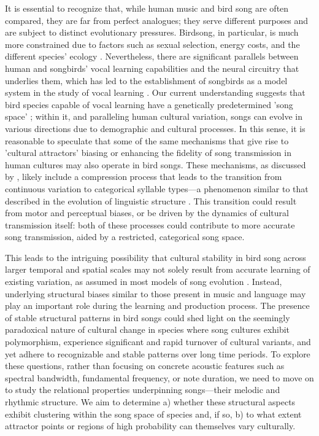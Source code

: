 It is essential to recognize that, while human music and bird song are often compared, they are far from perfect analogues; they serve different purposes and are subject to distinct evolutionary pressures. Birdsong, in particular, is much more constrained due to factors such as sexual selection, energy costs, and the different species' ecology \autocite{verzijden2012, demery2021, nowicki1998, spencer2003, sierro2023}. Nevertheless, there are significant parallels between human and songbirds' vocal learning capabilities and the neural circuitry that underlies them, which has led to the establishment of songbirds as a model system in the study of vocal learning \autocite{jarvis2019, rouse2021}. Our current understanding suggests that bird species capable of vocal learning have a genetically predetermined 'song space' \autocite{james2017, lachlan2010}; within it, and paralleling human cultural variation, songs can evolve in various directions due to demographic and cultural processes. In this sense, it is reasonable to speculate that some of the same mechanisms that give rise to 'cultural attractors' biasing or enhancing the fidelity of song transmission in human cultures may also operate in bird songs. These mechanisms, as discussed by \autocite{tchernichovski2017}, likely include a compression process that leads to the transition from continuous variation to categorical syllable types---a phenomenon similar to that described in the evolution of linguistic structure \autocite{gibson2019, decastro-arrazola2019, kirby2017, tamariz2016, silvey2019}. This transition could result from motor and perceptual biases, or be driven by the dynamics of cultural transmission itself: both of these processes could contribute to more accurate song transmission, aided by a restricted, categorical song space.

This leads to the intriguing possibility that cultural stability in bird song across larger temporal and spatial scales may not solely result from accurate learning of existing variation, as assumed in most models of song evolution \autocite{lachlan2018, hudson2022, pichkar2023, youngblood2022}. Instead, underlying structural biases similar to those present in music and language may play an important role during the learning and production process. The presence of stable structural patterns in bird songs could shed light on the seemingly paradoxical nature of cultural change in species where song cultures exhibit polymorphism, experience significant and rapid turnover of cultural variants, and yet adhere to recognizable and stable patterns over long time periods. To explore these questions, rather than focusing on concrete acoustic features such as spectral bandwidth, fundamental frequency, or note duration, we need to move on to study the relational properties underpinning songs---their melodic and rhythmic structure. We aim to determine a) whether these structural aspects exhibit clustering within the song space of species and, if so, b) to what extent attractor points or regions of high probability can themselves vary culturally. 


